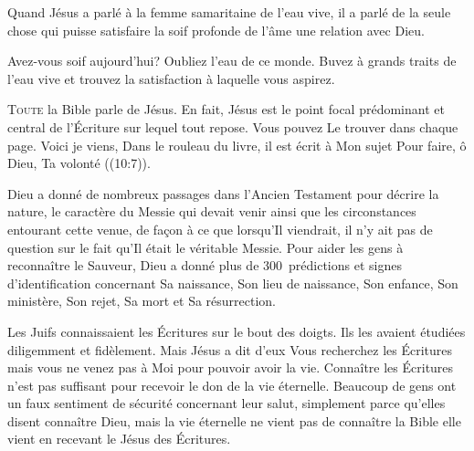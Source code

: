 Quand Jésus a parlé à la femme samaritaine de l'eau vive,
 il a parlé de la seule chose qui puisse satisfaire
 la soif profonde de l'âme \ocadr une relation avec Dieu.

Avez-vous soif aujourd'hui? Oubliez l'eau de ce monde.
 Buvez à grands traits de l'eau vive et trouvez la satisfaction
 à laquelle vous aspirez.

\dvrule






\lettrine{T}{oute} la Bible parle de Jésus.
 En fait, Jésus est le point focal prédominant et central de l'Écriture
 sur lequel tout repose. Vous pouvez Le trouver dans chaque page.
 \Og Voici\frcolon{} je viens, \ocadr Dans le rouleau du livre,
 il est écrit à Mon sujet \fcadr{}
 Pour faire, ô Dieu, Ta volonté \Fg{} ((10:7)).

Dieu a donné de nombreux passages dans l'Ancien Testament
 pour décrire la nature, le caractère du Messie qui devait venir
 ainsi que les circonstances entourant cette venue, de fa\c{c}on à ce que
 lorsqu'Il viendrait, il n'y ait pas de question sur le fait qu'Il était
 le véritable Messie. Pour aider les gens à reconnaître le Sauveur,
 Dieu a donné plus de 300~prédictions et signes d'identification
 concernant Sa naissance, Son lieu de naissance, Son enfance,
 Son ministère, Son rejet, Sa mort et Sa résurrection.


Les Juifs connaissaient les Écritures sur le bout des doigts.
 Ils les avaient étudiées diligemment et fidèlement.
 Mais Jésus a dit d'eux\frcolon{} 
 \Og Vous recherchez les Écritures mais vous ne venez pas à Moi
 pour pouvoir avoir la vie. \Fg{}
 Connaître les Écritures n'est pas suffisant pour recevoir
 le don de la vie éternelle. Beaucoup de gens ont un faux sentiment
 de sécurité concernant leur salut, simplement parce qu'elles disent
 connaître Dieu, mais la vie éternelle ne vient pas de connaître la Bible
 \ocadr elle vient en recevant le Jésus des Écritures.

